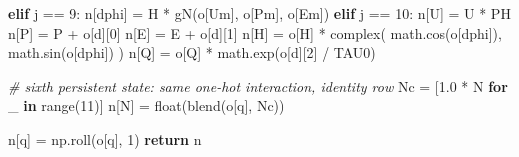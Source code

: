 \documentclass[
  a4paper,
]{article}
\newenvironment{Shaded}{}{}
\newcommand{\BuiltInTok}[1]{\textcolor[rgb]{0.00,0.50,0.00}{#1}}
\newcommand{\CommentTok}[1]{\textcolor[rgb]{0.38,0.63,0.69}{\textit{#1}}}
\newcommand{\ControlFlowTok}[1]{\textcolor[rgb]{0.00,0.44,0.13}{\textbf{#1}}}
\newcommand{\DecValTok}[1]{\textcolor[rgb]{0.25,0.63,0.44}{#1}}
\newcommand{\FloatTok}[1]{\textcolor[rgb]{0.25,0.63,0.44}{#1}}
\newcommand{\KeywordTok}[1]{\textcolor[rgb]{0.00,0.44,0.13}{\textbf{#1}}}
\newcommand{\NormalTok}[1]{#1}
\newcommand{\OperatorTok}[1]{\textcolor[rgb]{0.40,0.40,0.40}{#1}}
\newcommand{\StringTok}[1]{\textcolor[rgb]{0.25,0.44,0.63}{#1}}
\begin{document}
\begin{Shaded}
\begin{Highlighting}[]
    \ControlFlowTok{elif}\NormalTok{ j }\OperatorTok{==} \DecValTok{9}\NormalTok{:}
\NormalTok{        n[}\StringTok{\textquotesingle{}dphi\textquotesingle{}}\NormalTok{] }\OperatorTok{=}\NormalTok{ H }\OperatorTok{*}\NormalTok{ gN(o[}\StringTok{\textquotesingle{}Um\textquotesingle{}}\NormalTok{], o[}\StringTok{\textquotesingle{}Pm\textquotesingle{}}\NormalTok{], o[}\StringTok{\textquotesingle{}Em\textquotesingle{}}\NormalTok{])}
    \ControlFlowTok{elif}\NormalTok{ j }\OperatorTok{==} \DecValTok{10}\NormalTok{:}
\NormalTok{        n[}\StringTok{\textquotesingle{}U\textquotesingle{}}\NormalTok{] }\OperatorTok{=}\NormalTok{ U }\OperatorTok{*}\NormalTok{ PH}
\NormalTok{        n[}\StringTok{\textquotesingle{}P\textquotesingle{}}\NormalTok{] }\OperatorTok{=}\NormalTok{ P }\OperatorTok{+}\NormalTok{ o[}\StringTok{\textquotesingle{}d\textquotesingle{}}\NormalTok{][}\DecValTok{0}\NormalTok{]}
\NormalTok{        n[}\StringTok{\textquotesingle{}E\textquotesingle{}}\NormalTok{] }\OperatorTok{=}\NormalTok{ E }\OperatorTok{+}\NormalTok{ o[}\StringTok{\textquotesingle{}d\textquotesingle{}}\NormalTok{][}\DecValTok{1}\NormalTok{]}
\NormalTok{        n[}\StringTok{\textquotesingle{}H\textquotesingle{}}\NormalTok{] }\OperatorTok{=}\NormalTok{ o[}\StringTok{\textquotesingle{}H\textquotesingle{}}\NormalTok{] }\OperatorTok{*} \BuiltInTok{complex}\NormalTok{(}
\NormalTok{            math.cos(o[}\StringTok{\textquotesingle{}dphi\textquotesingle{}}\NormalTok{]), math.sin(o[}\StringTok{\textquotesingle{}dphi\textquotesingle{}}\NormalTok{])}
\NormalTok{        )}
\NormalTok{        n[}\StringTok{\textquotesingle{}Q\textquotesingle{}}\NormalTok{] }\OperatorTok{=}\NormalTok{ o[}\StringTok{\textquotesingle{}Q\textquotesingle{}}\NormalTok{] }\OperatorTok{*}\NormalTok{ math.exp(o[}\StringTok{\textquotesingle{}d\textquotesingle{}}\NormalTok{][}\DecValTok{2}\NormalTok{] }\OperatorTok{/}\NormalTok{ TAU0)}

    \CommentTok{\# sixth persistent state: same one{-}hot interaction, identity row}
\NormalTok{    Nc }\OperatorTok{=}\NormalTok{ [}\FloatTok{1.0} \OperatorTok{*}\NormalTok{ N }\ControlFlowTok{for}\NormalTok{ \_ }\KeywordTok{in} \BuiltInTok{range}\NormalTok{(}\DecValTok{11}\NormalTok{)]}
\NormalTok{    n[}\StringTok{\textquotesingle{}N\textquotesingle{}}\NormalTok{] }\OperatorTok{=} \BuiltInTok{float}\NormalTok{(blend(o[}\StringTok{\textquotesingle{}q\textquotesingle{}}\NormalTok{], Nc))}

\NormalTok{    n[}\StringTok{\textquotesingle{}q\textquotesingle{}}\NormalTok{] }\OperatorTok{=}\NormalTok{ np.roll(o[}\StringTok{\textquotesingle{}q\textquotesingle{}}\NormalTok{], }\DecValTok{1}\NormalTok{)}
    \ControlFlowTok{return}\NormalTok{ n}
\end{Highlighting}
\end{Shaded}
\end{document}
